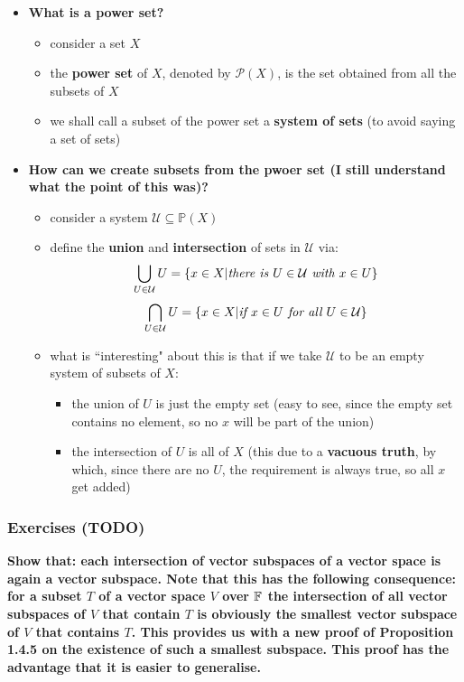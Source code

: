 \documentclass{exam}
\begin{document}
\begin{itemize}
    \item \textbf{What is a power set?}
    \begin{itemize}
        \item consider a set $X$
        \item the \textbf{power set} of $X$, denoted by $\mathcal{P}(X)$, is the set obtained from all the subsets of $X$
        \item we shall call a subset of the power set a \textbf{system of sets} (to avoid saying a set of sets)
    \end{itemize}
    \item \textbf{How can we create subsets from the pwoer set (I still understand what the point of this was)?}
    \begin{itemize}
        \item consider a system $\mathcal{U} \subseteq \mathbb{P}(X)$
        \item define the \textbf{union} and \textbf{intersection} of sets in $\mathcal{U}$ via:
        \[
        \bigcup_{U \in \mathcal{U}}U = \{x \in X | \text{\textit{there is $U \in \mathcal{U}$ with $x \in U$}}\}
        \]
        \[
        \bigcap_{U \in \mathcal{U}}U = \{x \in X | \text{\textit{if $x \in U$ for all $U \in \mathcal{U}$}}\}
        \]
        \item what is ``interesting" about this is that if we take $\mathcal{U}$ to be an empty system of subsets of $X$:
        \begin{itemize}
            \item the union of $U$ is just the empty set (easy to see, since the empty set contains no element, so no $x$ will be part of the union)
            \item the intersection of $U$ is all of $X$ (this due to a \textbf{vacuous truth}, by which, since there are no $U$, the requirement is always true, so all $x$ get added)
        \end{itemize}
    \end{itemize}
\end{itemize}

\subsubsection{Exercises (TODO)}

\begin{questions}

\question \textbf{Show that: each intersection of vector subspaces of a vector space is again a vector subspace. Note that
this has the following consequence: for a subset $T$ of a vector space $V$ over $\mathbb{F}$ the intersection of all vector subspaces of
$V$ that contain $T$ is obviously the smallest vector subspace of $V$ that contains $T$. This provides us with a new proof of
Proposition 1.4.5 on the existence of such a smallest subspace. This proof has the advantage that it is easier to generalise.}

\end{questions}
\end{document}
